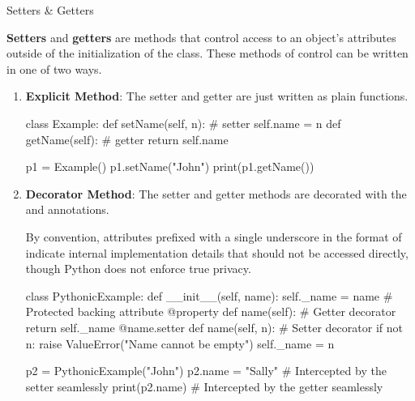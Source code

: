 \documentclass[10pt]{article}
\begin{document}
    \begin{core}{Setters \& Getters}

      \textbf{Setters} and \textbf{getters} are methods that control access to an object's attributes outside of the initialization of the class. These methods of control can be written in one of two ways.

      \begin{enumerate}

        \item \textbf{Explicit Method}: The setter and getter are just written as plain functions.

        \begin{pyconsole}

          class Example:
              def setName(self, n): # setter
                  self.name = n
              def getName(self): # getter
                  return self.name

          p1 = Example()
          p1.setName("John")
          print(p1.getName())

        \end{pyconsole}

        \item \textbf{Decorator Method}: The setter and getter methods are decorated with the  and  annotations.

        By convention, attributes prefixed with a single underscore in the format of  indicate internal implementation details that should not be accessed directly, though Python does not enforce true privacy.

        \begin{pyconsole}

          class PythonicExample:
              def __init__(self, name):
                  self._name = name  # Protected backing attribute
              @property
              def name(self):  # Getter decorator
                  return self._name
              @name.setter
              def name(self, n):  # Setter decorator
                  if not n:
                      raise ValueError("Name cannot be empty")
                  self._name = n

          p2 = PythonicExample("John")
          p2.name = "Sally"  # Intercepted by the setter seamlessly
          print(p2.name)     # Intercepted by the getter seamlessly


\end{pyconsole}
\end{enumerate}
\end{core}
\end{document}
